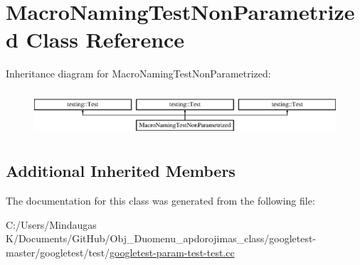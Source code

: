 \hypertarget{class_macro_naming_test_non_parametrized}{}\section{Macro\+Naming\+Test\+Non\+Parametrized Class Reference}
\label{class_macro_naming_test_non_parametrized}
Inheritance diagram for Macro\+Naming\+Test\+Non\+Parametrized\+:\begin{figure}[H]
\begin{center}
\leavevmode
\includegraphics[height=1.704718cm]{dc/d37/class_macro_naming_test_non_parametrized}
\end{center}
\end{figure}
\subsection*{Additional Inherited Members}


The documentation for this class was generated from the following file\+:\begin{DoxyCompactItemize}
\item 
C\+:/\+Users/\+Mindaugas K/\+Documents/\+Git\+Hub/\+Obj\+\_\+\+Duomenu\+\_\+apdorojimas\+\_\+class/googletest-\/master/googletest/test/\mbox{\hyperlink{googletest-master_2googletest_2test_2googletest-param-test-test_8cc}{googletest-\/param-\/test-\/test.\+cc}}\end{DoxyCompactItemize}
